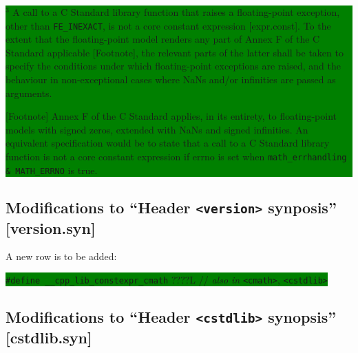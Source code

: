 \documentclass[prd,twocolumn,amsmath,amssymb,nofootinbib,eqsecnum]{revtex4-1}
\newcommand{\code}[1]{{\tt #1}}
\newcommand{\header}[1]{{\tt <#1>}}
\newcommand{\FEINEXACT}{{\tt FE\_INEXACT}}
\newcommand{\highlight}[1]{\colorbox{green}{\!\!\!\! #1}}
\begin{document}
\highlight{\parbox{\textwidth}{ \hspace{-2.5ex} $^3$
A call to a C Standard library function that raises a floating-point exception, other than \FEINEXACT, is not a core constant expression [expr.const]. To the extent that the floating-point model renders any part of Annex F of the C Standard applicable [Footnote], the relevant parts of the latter shall be taken to specify the conditions under which floating-point exceptions are raised, and the behaviour in non-exceptional cases where NaNs and/or infinities are passed as arguments.

[Footnote] Annex F of the C Standard applies, in its entirety, to floating-point models with signed zeros, extended with NaNs and signed infinities. An equivalent specification would be to state that a call to a C Standard library function is not a core constant expression if errno is set when \code{math\_errhandling \& MATH\_ERRNO} is true.
}}


\subsection{Modifications to ``Header \header{version} synposis'' [version.syn]}

A new row is to be added:

\vspace{1ex}

\highlight{
	\code{\#define \_\_cpp\_lib\_constexpr\_cmath} \qquad \qquad 20????L
	\qquad \qquad // {\it also in} \header{cmath}, \header{cstdlib}
}



\subsection{Modifications to ``Header \header{cstdlib} synopsis'' [cstdlib.syn]}
\end{document}
